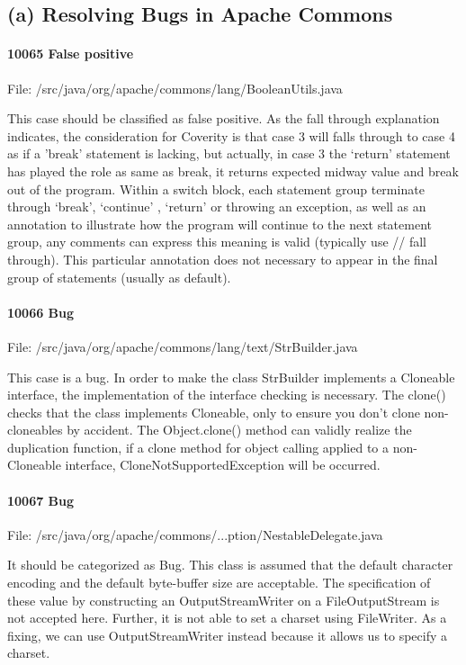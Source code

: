 \documentclass[12pt]{article}
\begin{document}
\subsection*{(a) Resolving Bugs in Apache Commons} 

\paragraph{10065  False positive}
File: /src/java/org/apache/commons/lang/BooleanUtils.java

This case should be classified as false positive. As the fall through explanation indicates, the consideration for Coverity is that case 3 will falls through to case 4 as if a 'break' statement is lacking, but actually, in case 3 the ‘return’ statement has played the role as same as break, it returns expected midway value and break out of the program.
Within a switch block, each statement group terminate through ‘break’, ‘continue’ , ‘return’ or throwing an exception, as well as an annotation to illustrate how the program will continue to the next statement group, any comments can express this meaning is valid (typically use // fall through). This particular annotation does not necessary to appear in the final group of statements (usually as default).

\paragraph{10066  Bug}
File: /src/java/org/apache/commons/lang/text/StrBuilder.java

This case is a bug. In order to make the class StrBuilder implements a Cloneable interface, the implementation of the interface checking is necessary. The clone() checks that the class implements Cloneable, only to ensure you don't clone non-cloneables by accident.
The Object.clone() method can validly realize the duplication function, if a clone method for object calling applied to a non-Cloneable interface, CloneNotSupportedException will be occurred.

\paragraph{10067  Bug}
File: /src/java/org/apache/commons/...ption/NestableDelegate.java

It should be categorized as Bug. This class is assumed that the default character encoding and the default byte-buffer size are acceptable. The specification of these value by constructing an OutputStreamWriter on a FileOutputStream is not accepted here. Further, it is not able to set a charset using FileWriter. As a fixing, we can use OutputStreamWriter instead because it allows us to specify a charset.
\end{document}
